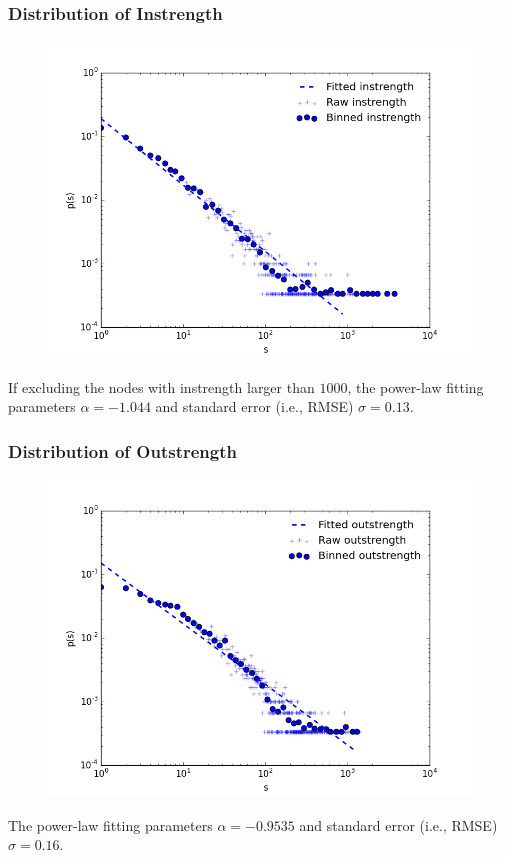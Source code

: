 \documentclass{beamer}
\begin{document}
\begin{frame}
\frametitle{Distribution of Instrength}
\begin{figure}
\includegraphics[width=0.8\linewidth]{figs/instrength_1000.png}
\end{figure}
\small{If excluding the nodes with instrength larger than $1000$, the power-law fitting parameters $\alpha=-1.044$ and standard error (i.e., RMSE) $\sigma= 0.13$.}
\end{frame}


\begin{frame}
\frametitle{Distribution of Outstrength}
\begin{figure}
\includegraphics[width=0.8\linewidth]{figs/outstrength.png}
\end{figure}
\small{The power-law fitting parameters $\alpha=-0.9535$ and standard error (i.e., RMSE) $\sigma= 0.16$.}
\end{frame}
\end{document}
